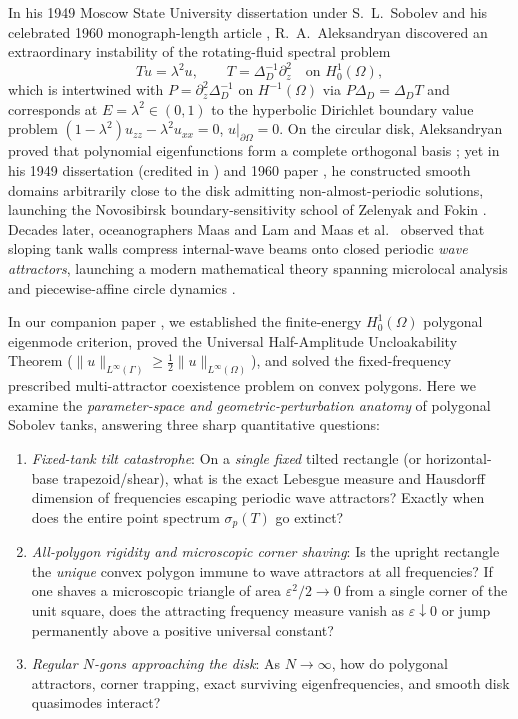 \documentclass[11pt,reqno]{amsart}
\theoremstyle{definition}
\theoremstyle{remark}
\begin{document}
In his 1949 Moscow State University dissertation under S.~L.~Sobolev and his celebrated 1960 monograph-length article \cite{Aleksandryan1960}, R.~A.~Aleksandryan discovered an extraordinary instability of the rotating-fluid spectral problem
\begin{equation}\label{eq:sobolev-p2}
  T u = \lambda^2 u, \qquad T = \Delta_D^{-1}\partial_z^2 \quad \text{on } H_0^1(\Omega),
\end{equation}
which is intertwined with $P = \partial_z^2\Delta_D^{-1}$ on $H^{-1}(\Omega)$ via $P\Delta_D = \Delta_D T$ and corresponds at $E = \lambda^2 \in (0,1)$ to the hyperbolic Dirichlet boundary value problem $(1-\lambda^2)u_{zz} - \lambda^2 u_{xx} = 0$, $u|_{\partial\Omega} = 0$. On the circular disk, Aleksandryan proved that polynomial eigenfunctions form a complete orthogonal basis \cite[\S 9, Thms.~13--14\,bis]{Aleksandryan1960}; yet in his 1949 dissertation (credited in \cite[p.~1225]{Zelenyak1965}) and 1960 paper \cite{Aleksandryan1960}, he constructed smooth domains arbitrarily close to the disk admitting non-almost-periodic solutions, launching the Novosibirsk boundary-sensitivity school of Zelenyak \cite{Zelenyak1965,Zelenyak1970} and Fokin \cite{Fokin1994}. Decades later, oceanographers Maas and Lam \cite{MaasLam1995} and Maas et al.\ \cite{Maas1997} observed that sloping tank walls compress internal-wave beams onto closed periodic \emph{wave attractors}, launching a modern mathematical theory spanning microlocal analysis \cite{CdVSR2020,DyatlovZworski2019,DWZ2025,Li2024} and piecewise-affine circle dynamics \cite{Kopecz2006,BajarsFrankMaas2013,NogueiraTroubetzkoy2020,LBC2023}.

In our companion paper \cite{Paper1}, we established the finite-energy $H_0^1(\Omega)$ polygonal eigenmode criterion, proved the Universal Half-Amplitude Uncloakability Theorem ($\|u\|_{L^\infty(\Gamma)} \ge \frac{1}{2}\|u\|_{L^\infty(\Omega)}$), and solved the fixed-frequency prescribed multi-attractor coexistence problem on convex polygons. Here we examine the \emph{parameter-space and geometric-perturbation anatomy} of polygonal Sobolev tanks, answering three sharp quantitative questions:
\begin{enumerate}
  \item \emph{Fixed-tank tilt catastrophe}: On a \emph{single fixed} tilted rectangle (or horizontal-base trapezoid/shear), what is the exact Lebesgue measure and Hausdorff dimension of frequencies escaping periodic wave attractors? Exactly when does the entire point spectrum $\sigma_p(T)$ go extinct?
  \item \emph{All-polygon rigidity and microscopic corner shaving}: Is the upright rectangle the \emph{unique} convex polygon immune to wave attractors at all frequencies? If one shaves a microscopic triangle of area $\varepsilon^2/2 \to 0$ from a single corner of the unit square, does the attracting frequency measure vanish as $\varepsilon \downarrow 0$ or jump permanently above a positive universal constant?
  \item \emph{Regular $N$-gons approaching the disk}: As $N \to \infty$, how do polygonal attractors, corner trapping, exact surviving eigenfrequencies, and smooth disk quasimodes interact?
\end{enumerate}
\end{document}
